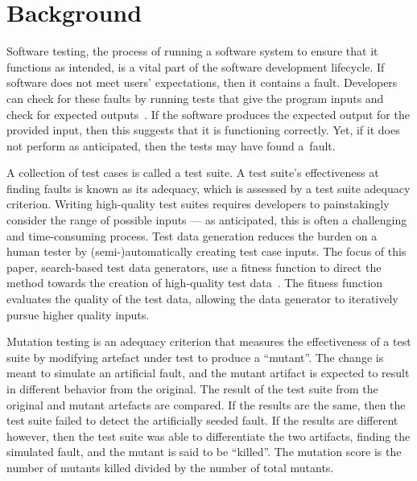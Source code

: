 \section{Background}\label{sec:background}


Software testing, the process of running a software system to ensure that it functions as intended, is a vital part of
the software development lifecycle. If software does not meet users' expectations, then it contains a fault.  Developers
can check for these faults by running tests that give the program inputs and check for expected
outputs~\cite{ammann2008}.  If the software produces the expected output for the provided input, then this suggests that
it is functioning correctly.  Yet, if it does not perform as anticipated, then the tests may have found \mbox{a fault}.


A collection of test cases is called a test suite. A test suite's effectiveness at finding faults is known as its
adequacy, which is assessed by a test suite adequacy criterion.  Writing high-quality test suites requires developers to
painstakingly consider the range of possible inputs --- as anticipated, this is often a challenging and time-consuming
process. Test data generation reduces the burden on a human tester by (semi-)automatically creating test case inputs.
The focus of this paper, search-based test data generators, use a fitness function to direct the method towards the
creation of high-quality test data~\cite{STVR:STVR294}. The fitness function evaluates the quality of the test data,
allowing the data generator to iteratively pursue higher quality inputs.


Mutation testing is an adequacy criterion that measures the effectiveness of a test suite by modifying artefact under
test to produce a ``mutant''. The change is meant to simulate an artificial fault, and the mutant artifact is expected
to result in different behavior from the original. The result of the test suite from the original and mutant artefacts
are compared. If the results are the same, then the test suite failed to detect the artificially seeded fault. If the
results are different however, then the test suite was able to differentiate the two artifacts, finding the simulated
fault, and the mutant is said to be ``killed''.  The mutation score is the number of mutants killed divided by the
number of total mutants.

